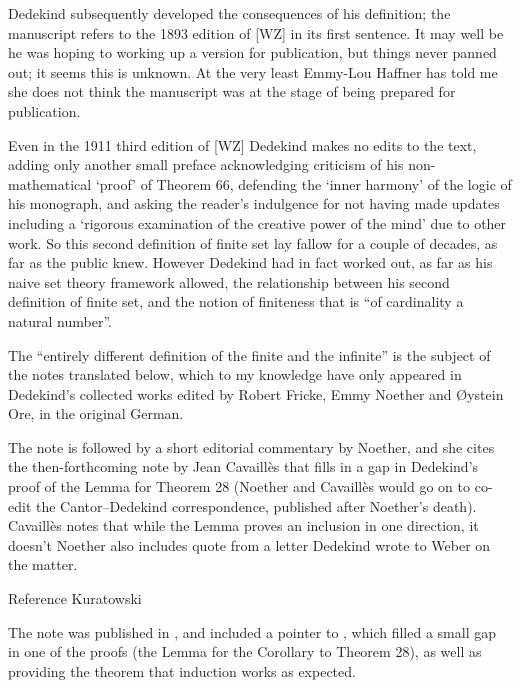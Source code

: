\documentclass[leqno,hidelinks,10pt]{article}
\theoremstyle{definition}
\begin{document}
Dedekind subsequently developed the consequences of his definition; the manuscript %
refers to the 1893 edition of [WZ] in its first sentence. 
It may well be he was hoping to working up a version for publication, but things never panned out; it seems this is unknown.
At the very least Emmy-Lou Haffner has told me she does not think the manuscript was at the stage of being prepared for publication.

Even in the 1911 third edition of [WZ] Dedekind makes no edits to the text, adding only another small preface acknowledging criticism of his non-mathematical `proof' of Theorem 66, defending the `inner harmony' of the logic of his monograph, and asking the reader's indulgence for not having made updates including a `rigorous examination of the creative power of the mind' due to other work. 
So this second definition of finite set lay fallow for a couple of decades, as far as the public knew. 
However Dedekind had in fact worked out, as far as his naive set theory framework allowed, the relationship between his second definition of finite set, and the notion of finiteness that is ``of cardinality a natural number''.

The ``entirely different definition of the finite and the infinite'' is the subject of the notes translated below, which to my knowledge have only appeared in Dedekind's collected works \cite[Vol.~3, page~450]{Dedekind_Werke} edited by Robert Fricke, Emmy Noether and \O ystein Ore, in the original German. 

The note is followed by a short editorial commentary by Noether, and she cites the then-forthcoming note \cite{Cavailes_32} by Jean Cavaill\`es that fills in a gap in Dedekind's proof of the Lemma for Theorem 28 (Noether and Cavaill\`es would go on to co-edit the Cantor--Dedekind correspondence, published after Noether's death). 
Cavaill\`es notes that while the Lemma proves an inclusion in one direction, it doesn't 
Noether also includes quote from a letter Dedekind wrote to Weber on the matter.

Reference Kuratowski


\bigskip

The note was published in \cite{Dedekind_Werke}, and included a pointer to \cite{Cavailes_32}, which filled a small gap in one of the proofs (the Lemma for the Corollary to Theorem 28), as well as providing the theorem that induction works as expected.
\end{document}
